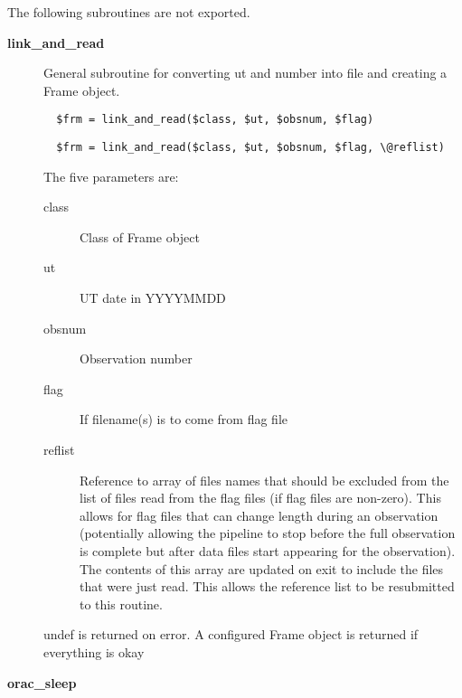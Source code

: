 The following subroutines are not exported.

\begin{description}

\item[\textbf{link\_and\_read}] \mbox{}

General subroutine for converting ut and number into file
and creating a Frame object.

\begin{verbatim}
  $frm = link_and_read($class, $ut, $obsnum, $flag)
\end{verbatim}
\begin{verbatim}
  $frm = link_and_read($class, $ut, $obsnum, $flag, \@reflist)
\end{verbatim}


The five parameters are:

\begin{description}

\item[class] \mbox{}

Class of Frame object


\item[ut] \mbox{}

UT date in YYYYMMDD


\item[obsnum] \mbox{}

Observation number


\item[flag] \mbox{}

If filename(s) is to come from flag file


\item[reflist] \mbox{}

Reference to array of files names that should be excluded from
the list of files read from the flag files (if flag files are non-zero).
This allows for flag files that can change length during an observation
(potentially allowing the pipeline to stop before the full observation
is complete but after data files start appearing for the observation).
The contents of this array are updated on exit to include the files that
were just read. This allows the reference list to be resubmitted
to this routine.

\end{description}


undef is returned on error.
A configured Frame object is returned if everything is okay


\item[\textbf{orac\_sleep}] \mbox{}


\end{description}
